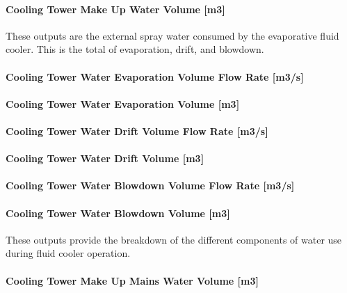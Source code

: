 \paragraph{Cooling Tower Make Up Water Volume {[}m3{]}}\label{cooling-tower-make-up-water-volume-m3-5}

These outputs are the external spray water consumed by the evaporative fluid cooler. This is the total of evaporation, drift, and blowdown.

\paragraph{Cooling Tower Water Evaporation Volume Flow Rate {[}m3/s{]}}\label{cooling-tower-water-evaporation-volume-flow-rate-m3s-5}

\paragraph{Cooling Tower Water Evaporation Volume {[}m3{]}}\label{cooling-tower-water-evaporation-volume-m3-5}

\paragraph{Cooling Tower Water Drift Volume Flow Rate {[}m3/s{]}}\label{cooling-tower-water-drift-volume-flow-rate-m3s-5}

\paragraph{Cooling Tower Water Drift Volume {[}m3{]}}\label{cooling-tower-water-drift-volume-m3-5}

\paragraph{Cooling Tower Water Blowdown Volume Flow Rate {[}m3/s{]}}\label{cooling-tower-water-blowdown-volume-flow-rate-m3s-5}

\paragraph{Cooling Tower Water Blowdown Volume {[}m3{]}}\label{cooling-tower-water-blowdown-volume-m3-5}

These outputs provide the breakdown of the different components of water use during fluid cooler operation.

\paragraph{Cooling Tower Make Up Mains Water Volume {[}m3{]}}\label{cooling-tower-make-up-mains-water-volume-m3-5}


